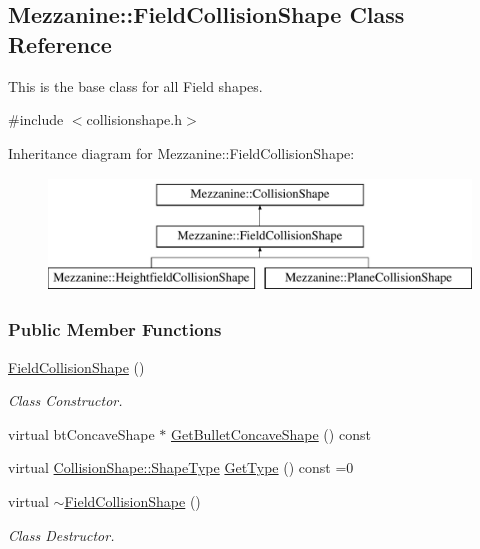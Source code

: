 \hypertarget{classMezzanine_1_1FieldCollisionShape}{
\subsection{Mezzanine::FieldCollisionShape Class Reference}
\label{classMezzanine_1_1FieldCollisionShape}
}


This is the base class for all Field shapes.  




{\ttfamily \#include $<$collisionshape.h$>$}

Inheritance diagram for Mezzanine::FieldCollisionShape:\begin{figure}[H]
\begin{center}
\leavevmode
\includegraphics[height=3.000000cm]{classMezzanine_1_1FieldCollisionShape}
\end{center}
\end{figure}
\subsubsection*{Public Member Functions}
\begin{DoxyCompactItemize}
\item 
\hypertarget{classMezzanine_1_1FieldCollisionShape_a13552192ce6c0133afaee02626b522ba}{
\hyperlink{classMezzanine_1_1FieldCollisionShape_a13552192ce6c0133afaee02626b522ba}{FieldCollisionShape} ()}
\label{classMezzanine_1_1FieldCollisionShape_a13552192ce6c0133afaee02626b522ba}

\begin{DoxyCompactList}\small\item\em Class Constructor. \item\end{DoxyCompactList}\item 
virtual btConcaveShape $\ast$ \hyperlink{classMezzanine_1_1FieldCollisionShape_abd6d91caf9460d289c739d83a3c314a4}{GetBulletConcaveShape} () const 
\item 
virtual \hyperlink{classMezzanine_1_1CollisionShape_ad04186055565998879b64176d6dd100d}{CollisionShape::ShapeType} \hyperlink{classMezzanine_1_1FieldCollisionShape_a85a444fa9bcaca9fec08c3b5697677c9}{GetType} () const =0
\item 
\hypertarget{classMezzanine_1_1FieldCollisionShape_afbead5b5df9bbc2b2e2fe3551c27b302}{
virtual \hyperlink{classMezzanine_1_1FieldCollisionShape_afbead5b5df9bbc2b2e2fe3551c27b302}{$\sim$FieldCollisionShape} ()}
\label{classMezzanine_1_1FieldCollisionShape_afbead5b5df9bbc2b2e2fe3551c27b302}

\begin{DoxyCompactList}\small\item\em Class Destructor. \item\end{DoxyCompactList}\end{DoxyCompactItemize}
